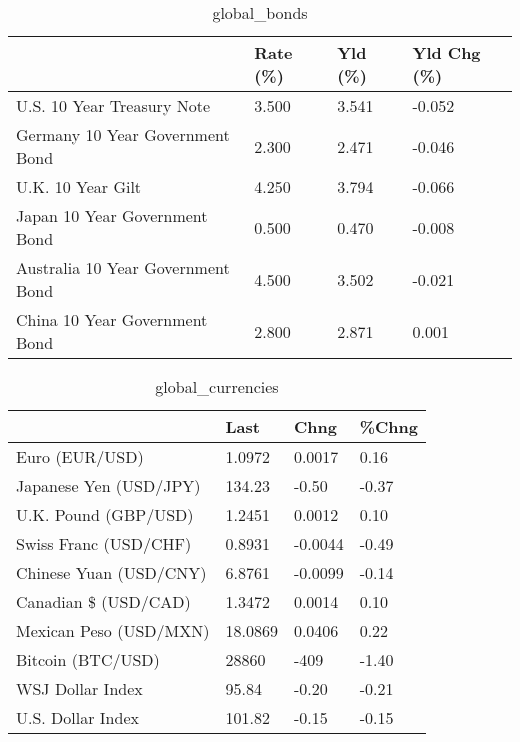 \documentclass{article}%
\begin{document}
%


\begin{table}[htbp]%
\caption{global\_bonds}%
\centering%
\begin{adjustbox}{width=1\textwidth}%
\begin{tabular}{llll}
\toprule
                                  & Rate (\%) & Yld (\%) & Yld Chg (\%) \\
\midrule
       U.S. 10 Year Treasury Note &    3.500 &   3.541 &      -0.052 \\
  Germany 10 Year Government Bond &    2.300 &   2.471 &      -0.046 \\
                U.K. 10 Year Gilt &    4.250 &   3.794 &      -0.066 \\
    Japan 10 Year Government Bond &    0.500 &   0.470 &      -0.008 \\
Australia 10 Year Government Bond &    4.500 &   3.502 &      -0.021 \\
    China 10 Year Government Bond &    2.800 &   2.871 &       0.001 \\
\bottomrule
\end{tabular}
%
\end{adjustbox}%
\end{table}

%


\begin{table}[htbp]%
\caption{global\_currencies}%
\centering%
\begin{adjustbox}{width=1\textwidth}%
\begin{tabular}{llll}
\toprule
                       &    Last &    Chng & \%Chng \\
\midrule
        Euro (EUR/USD) &  1.0972 &  0.0017 &  0.16 \\
Japanese Yen (USD/JPY) &  134.23 &   -0.50 & -0.37 \\
  U.K. Pound (GBP/USD) &  1.2451 &  0.0012 &  0.10 \\
 Swiss Franc (USD/CHF) &  0.8931 & -0.0044 & -0.49 \\
Chinese Yuan (USD/CNY) &  6.8761 & -0.0099 & -0.14 \\
  Canadian \$ (USD/CAD) &  1.3472 &  0.0014 &  0.10 \\
Mexican Peso (USD/MXN) & 18.0869 &  0.0406 &  0.22 \\
     Bitcoin (BTC/USD) &   28860 &    -409 & -1.40 \\
      WSJ Dollar Index &   95.84 &   -0.20 & -0.21 \\
     U.S. Dollar Index &  101.82 &   -0.15 & -0.15 \\
\bottomrule
\end{tabular}
%
\end{adjustbox}%
\end{table}
\end{document}
